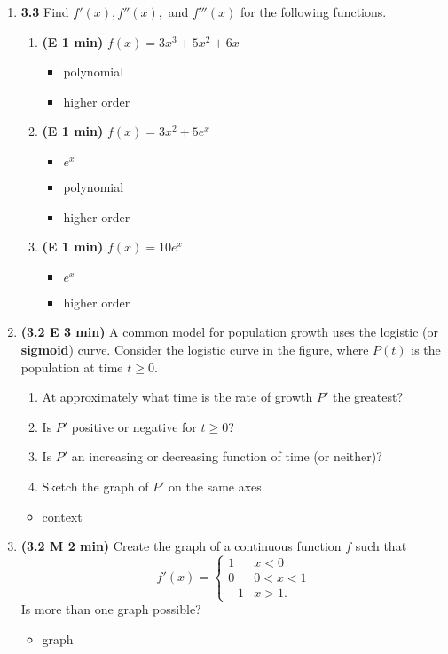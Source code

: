 \documentclass[12pt]{article}
\begin{document}
\begin{enumerate}[1.]
\item {\bf 3.3} Find $f'(x),f''(x),$ and $f'''(x)$ for the following functions.
\begin{enumerate}
	\item {\bf (E 1 min)} $f(x)=3x^3+5x^2+6x$
	{\bf\begin{itemize}
\item polynomial
\item higher order
\end{itemize}}
	\item {\bf (E 1 min)} $f(x)=3x^2+5e^x$
	{\bf\begin{itemize}
\item $e^x$
\item polynomial
\item higher order
\end{itemize}}
	\item {\bf (E 1 min)} $f(x)=10e^x$
	{\bf\begin{itemize}
\item $e^x$
\item higher order
\end{itemize}}
\end{enumerate}

\item {\bf (3.2 E 3 min)} A common model for population growth uses the logistic (or \textbf{sigmoid}) curve.  Consider the logistic curve in the figure, where $P(t)$ is the population at time $t\geq 0$.
\begin{enumerate}
	\item At approximately what time is the rate of growth $P'$ the greatest?
	
	\item Is $P'$ positive or negative for $t\geq 0$?
	
	\item Is $P'$ an increasing or decreasing function of time (or neither)?
	
	\item Sketch the graph of $P'$ on the same axes.  
\end{enumerate}
{\bf\begin{itemize}
\item context
\end{itemize}}

\item {\bf (3.2 M 2 min)} Create the graph of a continuous function $f$ such that 
\[
f'(x)=\begin{cases}
	1 & x<0 \\
	0 & 0<x<1 \\ 
	-1 & x>1.
	\end{cases}
\]
Is more than one graph possible?
{\bf\begin{itemize}
\item graph
\end{itemize}}

\end{enumerate}
\end{document}
